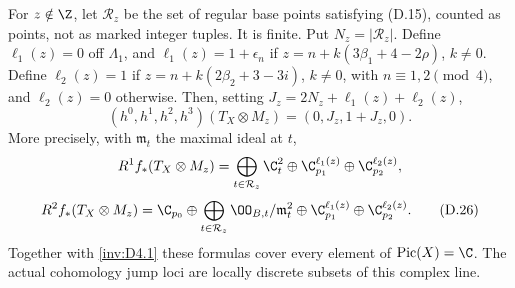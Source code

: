 \begin{proposition}\label{inv:D4.5}
For $z\notin\Z$, let $\mathcal R_z$ be the set of regular base
points satisfying (D.15), counted as points, not as marked integer
tuples. It is finite. Put $N_z=|\mathcal R_z|$. Define
$\ell_1(z)=0$ off $\Lambda_1$, and
$\ell_1(z)=1+\epsilon_n$ if
$z=n+k(3\beta_1+4-2\rho)$, $k\ne0$.
Define $\ell_2(z)=1$ if
$z=n+k(2\beta_2+3-3i)$, $k\ne0$, with
$n\equiv1,2\pmod4$, and $\ell_2(z)=0$ otherwise.
Then, setting $J_z=2N_z+\ell_1(z)+\ell_2(z)$,
\[
 \boxed{(h^0,h^1,h^2,h^3)(T_X\otimes M_z)=(0,J_z,1+J_z,0).} \tag{D.25}
\]
More precisely, with $\mathfrak m_t$ the maximal ideal at $t$,
\[
 R^1f_*(T_X\otimes M_z)=
   \bigoplus_{t\in\mathcal R_z}\C_t^2
      \oplus\C_{p_1}^{\ell_1(z)}\oplus\C_{p_2}^{\ell_2(z)},
\]
\[
 R^2f_*(T_X\otimes M_z)=\C_{p_0}\oplus
   \bigoplus_{t\in\mathcal R_z}\OO_{B,t}/\mathfrak m_t^2
      \oplus\C_{p_1}^{\ell_1(z)}\oplus\C_{p_2}^{\ell_2(z)}. \tag{D.26}
\]
Together with \ref{inv:D4.1} these formulas cover every element of
$\operatorname{Pic}(X)=\C$. The actual cohomology jump loci are
locally discrete subsets of this complex line.
\end{proposition}

